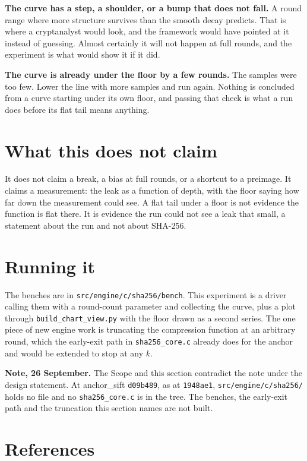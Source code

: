\textbf{The curve has a step, a shoulder, or a bump that does not fall.} A round range where more structure survives than the smooth decay predicts. That is where a cryptanalyst would look, and the framework would have pointed at it instead of guessing. Almost certainly it will not happen at full rounds, and the experiment is what would show it if it did.

\textbf{The curve is already under the floor by a few rounds.} The samples were too few. Lower the line with more samples and run again. Nothing is concluded from a curve starting under its own floor, and passing that check is what a run does before its flat tail means anything.

\section{What this does not claim}

It does not claim a break, a bias at full rounds, or a shortcut to a preimage. It claims a measurement: the leak as a function of depth, with the floor saying how far down the measurement could see. A flat tail under a floor is not evidence the function is flat there. It is evidence the run could not see a leak that small, a statement about the run and not about SHA-256.

\section{Running it}

The benches are in \texttt{src/\allowbreak{}engine/\allowbreak{}c/\allowbreak{}sha256/\allowbreak{}bench}. This experiment is a driver calling them with a round-count parameter and collecting the curve, plus a plot through \texttt{build\_chart\_view.py} with the floor drawn as a second series. The one piece of new engine work is truncating the compression function at an arbitrary round, which the early-exit path in \texttt{sha256\_core.c} already does for the anchor and would be extended to stop at any \(k\).

\textbf{Note, 26 September.} The Scope and this section contradict the note under the design statement. At anchor\_sift \texttt{d09b489}, as at \texttt{1948ae1}, \texttt{src/\allowbreak{}engine/\allowbreak{}c/\allowbreak{}sha256/} holds no file and no \texttt{sha256\_core.c} is in the tree. The benches, the early-exit path and the truncation this section names are not built.

\section{References}

